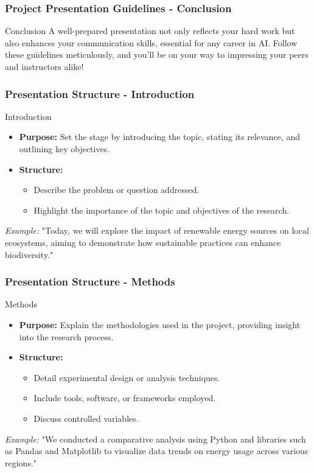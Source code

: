 \documentclass[aspectratio=169]{beamer}
\begin{document}
\begin{frame}[fragile]
    \frametitle{Project Presentation Guidelines - Conclusion}
    \begin{block}{Conclusion}
        A well-prepared presentation not only reflects your hard work but also enhances your communication skills, essential for any career in AI. Follow these guidelines meticulously, and you'll be on your way to impressing your peers and instructors alike!
    \end{block}
\end{frame}

\begin{frame}[fragile]
    \frametitle{Presentation Structure - Introduction}
    \begin{block}{Introduction}
        \begin{itemize}
            \item \textbf{Purpose:} Set the stage by introducing the topic, stating its relevance, and outlining key objectives.
            \item \textbf{Structure:}
            \begin{itemize}
                \item Describe the problem or question addressed.
                \item Highlight the importance of the topic and objectives of the research.
            \end{itemize}
        \end{itemize}
    \end{block}
    
    \textit{Example:} "Today, we will explore the impact of renewable energy sources on local ecosystems, aiming to demonstrate how sustainable practices can enhance biodiversity."
\end{frame}

\begin{frame}[fragile]
    \frametitle{Presentation Structure - Methods}
    \begin{block}{Methods}
        \begin{itemize}
            \item \textbf{Purpose:} Explain the methodologies used in the project, providing insight into the research process.
            \item \textbf{Structure:}
            \begin{itemize}
                \item Detail experimental design or analysis techniques.
                \item Include tools, software, or frameworks employed.
                \item Discuss controlled variables.
            \end{itemize}
        \end{itemize}
    \end{block}
    
    \textit{Example:} "We conducted a comparative analysis using Python and libraries such as Pandas and Matplotlib to visualize data trends on energy usage across various regions."
\end{frame}
\end{document}
